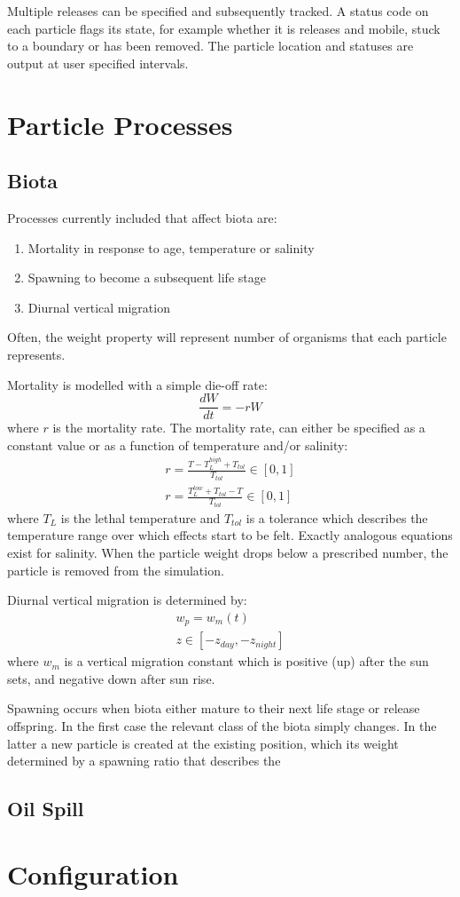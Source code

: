 \documentclass[a4paper]{article}
\begin{document}
Multiple releases can be specified and subsequently tracked.
A status code on each particle flags its state, for example whether it is releases and mobile, stuck to a boundary or has been removed.
The particle location and statuses are output at user specified intervals.

\section{Particle Processes}
\subsection{Biota}
Processes currently included that affect biota are:
\begin{enumerate}
\item Mortality in response to age, temperature or salinity
\item Spawning to become a subsequent life stage
\item Diurnal vertical migration
\end{enumerate}
Often, the weight property will represent number of organisms that each particle represents.

Mortality is modelled with a simple die-off rate:
\begin{equation}
\frac{dW}{dt}=-rW
\end{equation}
where $r$ is the mortality rate. The mortality rate, can either be specified as a constant value or as a function of temperature and/or salinity:
\begin{align}
r=\frac{T-T_L^{high}+T_{tol}}{T_{tol}} \in[0,1] \\
r=\frac{T_L^{low}+T_{tol}-T}{T_{tol}} \in[0,1]
\end{align}
where $T_L$ is the lethal temperature and $T_{tol}$ is a tolerance which describes the temperature range over which effects start to be felt.
Exactly analogous equations exist for salinity. When the particle weight drops below a prescribed number, the particle is removed from the simulation.

Diurnal vertical migration is determined by:
\begin{align}
w_p=w_m(t) \\
z \in [-z_{day},-z_{night}]
\end{align}
where $w_m$ is a vertical migration constant which is positive (up) after the sun sets, and negative down after sun rise.

Spawning occurs when biota either mature to their next life stage or release offspring.
In the first case the relevant class of the biota simply changes.
In the latter a new particle is created at the existing position, which its weight determined by a spawning ratio that describes the 

\subsection{Oil Spill}

\section{Configuration}
\end{document}
